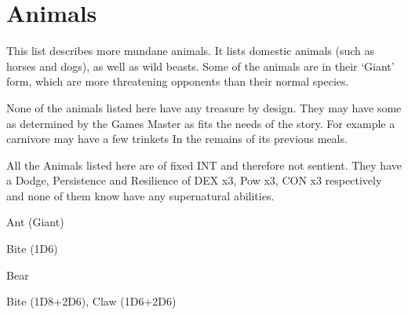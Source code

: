 \clearpage

\section{Animals}

This list describes more mundane animals. It lists domestic animals (such as horses and dogs), as well as wild beasts. Some of the animals are in their ‘Giant’ form, which are more threatening opponents than their normal species.

None of the animals listed here have any treasure by design. They may have some as determined by the Games Master as fits the needs of the story. For example a carnivore may have a few trinkets In the remains of its previous meals.

All the Animals listed here are of fixed INT and therefore not sentient. They have a Dodge, Persistence and Resilience of DEX x3, Pow x3, CON x3 respectively and none of them know have any supernatural abilities.

\vspace{1em}

\begin{samepage}
\begin{monsterbox}{Ant (Giant)}
	\basics[%
        hitpoints  = 12, 
	majorwound = 6,
	damagemodifier = 0,
	powerpoints = 6,
	movementrate = 15m,
	armor = Chitin (5 AP),
	]
	\rpghline%
	\stats[ %
		STR = 4D6   (14),
		CON = 3D6+6 (17),
		DEX = 2D6+6 (13),
		SIZ = 2D6   (7),
		INT = 2     (2),
		POW = 1D6+3 (6),
		CHA = 5     (5)
	]
	\rpghline%
	\begin{rpg-monsteraction}
		Bite (1D6)
	\end{rpg-monsteraction}
\end{monsterbox}
\end{samepage}


\begin{samepage}
\begin{monsterbox}{Bear}
	\basics[%
        hitpoints  = 19, 
	majorwound = 10,
	damagemodifier = 0,
	powerpoints = 11,
	movementrate = 23m,
	armor = Tough hide (3 AP),
	]
	\rpghline%
	\stats[ %
		STR = 3D6+15 (25),
		CON = 2D6+6  (13),
		DEX = 3D6    (11),
		SIZ = 3D6+15 (25),
		INT = 5     (5),
		POW = 3D6   (11),
		CHA = 5     (5)
	]
	\rpghline%
	\begin{rpg-monsteraction}
		Bite (1D8+2D6), Claw (1D6+2D6)
	\end{rpg-monsteraction}
\end{monsterbox}
\end{samepage}

